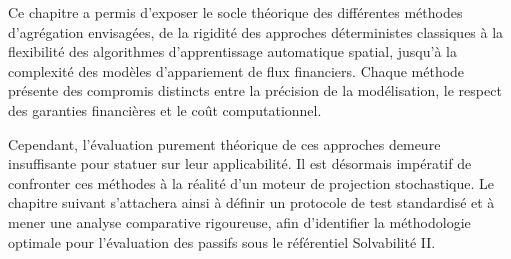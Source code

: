 \bigskip

Ce chapitre a permis d'exposer le socle théorique des différentes méthodes d'agrégation envisagées, de la rigidité des approches déterministes classiques à la flexibilité des algorithmes d'apprentissage automatique spatial, jusqu'à la complexité des modèles d'appariement de flux financiers. Chaque méthode présente des compromis distincts entre la précision de la modélisation, le respect des garanties financières et le coût computationnel. 

Cependant, l'évaluation purement théorique de ces approches demeure insuffisante pour statuer sur leur applicabilité. Il est désormais impératif de confronter ces méthodes à la réalité d'un moteur de projection stochastique. Le chapitre suivant s'attachera ainsi à définir un protocole de test standardisé et à mener une analyse comparative rigoureuse, afin d'identifier la méthodologie optimale pour l'évaluation des passifs sous le référentiel Solvabilité II.